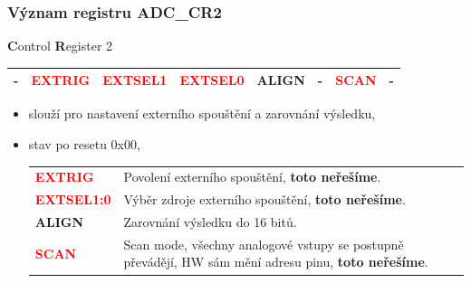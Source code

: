 	\begin{frame}
    \frametitle{Význam registru ADC\_CR2}

		\textbf{C}ontrol \textbf{R}egister 2

\begin{center}
			\tiny
			\begin{tabular}{| p{9mm} | p{9mm} | p{9mm} | p{9mm} | p{9mm} | p{9mm} | p{9mm} | p{9mm} |}
				\hline
				\hline
				\textbf{-} & \textcolor{red}{\textbf{EXTRIG}} & \textcolor{red}{\textbf{EXTSEL1}} & \textcolor{red}{\textbf{EXTSEL0}} & \textbf{ALIGN} & \textbf{-} & \textcolor{red}{\textbf{SCAN}} & \textbf{-} \\
				\hline
				\hline
			\end{tabular}
		\end{center}
				
		\begin{itemize}
			\item slouží pro nastavení externího spouštění a zarovnání výsledku,
			\item stav po resetu 0x00,
			\small
			\begin{center}
				\begin{tabular}{l p{80mm}}
					\textcolor{red}{\textbf{EXTRIG}} & Povolení externího spouštění, \textbf{toto neřešíme}. \\
					\textcolor{red}{\textbf{EXTSEL1:0}} & Výběr zdroje externího spouštění, \textbf{toto neřešíme}. \\
					\textbf{ALIGN} & Zarovnání výsledku do 16 bitů. \\
					\textcolor{red}{\textbf{SCAN}} & Scan mode, všechny analogové vstupy se postupně převádějí, HW sám mění adresu pinu, \textbf{toto neřešíme}. \\
				\end{tabular}
			\end{center}
		\end{itemize}
	\end{frame}
	
